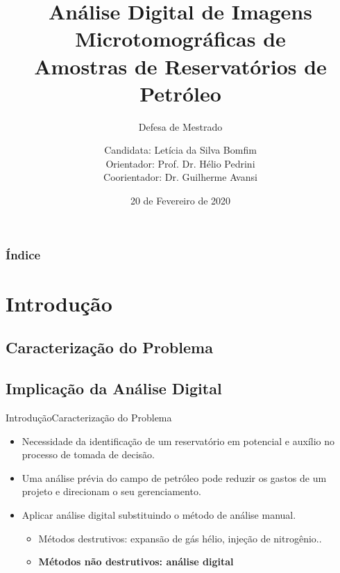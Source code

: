 \documentclass{beamer}
\title[Defesa de Mestrado]{Análise Digital de Imagens Microtomográficas de \\[0.1cm] Amostras de Reservatórios de Petróleo } %
\author[UNICAMP]{Candidata: Letícia da Silva Bomfim \\ Orientador: Prof. Dr. Hélio Pedrini \\Coorientador: Dr. Guilherme Avansi} %
\institute[]{Universidade Estadual de Campinas \\ Instituto de Computação}
\subtitle{Defesa de Mestrado}
\date{20 de Fevereiro de 2020} %
\begin{document}
\begin{frame}
\titlepage %
\end{frame}

\begin{frame}
\frametitle{Índice} %
\tableofcontents %
\end{frame}


\section{Introdução} %
\subsection{Caracterização do Problema} 
\subsection{Implicação da Análise Digital}



\begin{frame}{Introdução}{Caracterização do Problema}
\begin{itemize}

\item Necessidade da identificação de um reservatório em potencial e auxílio no processo de tomada de decisão.

\item Uma análise prévia do campo de petróleo pode reduzir os gastos de um projeto e direcionam o seu gerenciamento. 

\item Aplicar análise digital substituindo o método de análise manual.
\begin{itemize}
\item Métodos destrutivos: expansão de gás hélio, injeção de nitrogênio..
\item \textbf{Métodos não destrutivos: análise digital}
\end{itemize}
\end{itemize}

\end{frame}
\end{document}
